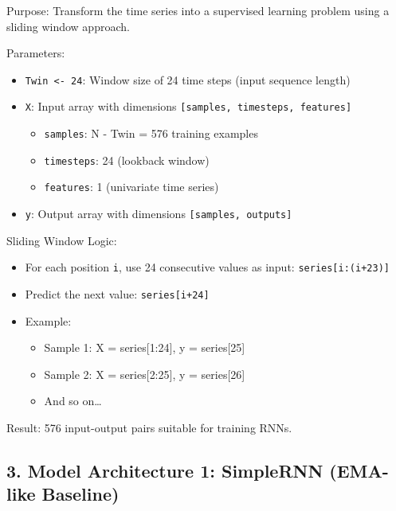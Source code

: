 \documentclass[
]{article}
\providecommand{\tightlist}{%
  \setlength{\itemsep}{0pt}\setlength{\parskip}{0pt}}
\begin{document}
Purpose: Transform the time series into a supervised learning problem
using a sliding window approach.

Parameters:

\begin{itemize}
\tightlist
\item
  \texttt{Twin\ \textless{}-\ 24}: Window size of 24 time steps (input
  sequence length)
\item
  \texttt{X}: Input array with dimensions
  \texttt{{[}samples,\ timesteps,\ features{]}}

  \begin{itemize}
  \tightlist
  \item
    \texttt{samples}: N - Twin = 576 training examples
  \item
    \texttt{timesteps}: 24 (lookback window)
  \item
    \texttt{features}: 1 (univariate time series)
  \end{itemize}
\item
  \texttt{y}: Output array with dimensions
  \texttt{{[}samples,\ outputs{]}}
\end{itemize}

Sliding Window Logic:

\begin{itemize}
\tightlist
\item
  For each position \texttt{i}, use 24 consecutive values as input:
  \texttt{series{[}i:(i+23){]}}
\item
  Predict the next value: \texttt{series{[}i+24{]}}
\item
  Example:

  \begin{itemize}
  \tightlist
  \item
    Sample 1: X = series{[}1:24{]}, y = series{[}25{]}
  \item
    Sample 2: X = series{[}2:25{]}, y = series{[}26{]}
  \item
    And so on\ldots{}
  \end{itemize}
\end{itemize}

Result: 576 input-output pairs suitable for training RNNs.

\subsection{3. Model Architecture 1: SimpleRNN (EMA-like
Baseline)}\label{model-architecture-1-simplernn-ema-like-baseline}
\end{document}
